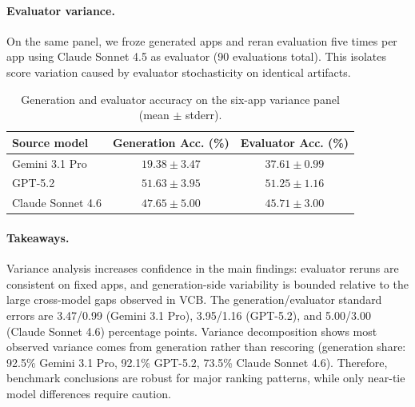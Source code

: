 \paragraph{Evaluator variance.}
On the same panel, we froze generated apps and reran evaluation five times per app using Claude Sonnet 4.5 as evaluator (90 evaluations total). This isolates score variation caused by evaluator stochasticity on identical artifacts.
\begin{table}[h]
\caption{Generation and evaluator accuracy on the six-app variance panel (mean $\pm$ stderr).}
\label{tab:generation_variance_summary}
\small
\begin{tabular}{@{}lcc@{}}
\toprule
\textbf{Source model} & \textbf{Generation Acc. (\%)} & \textbf{Evaluator Acc. (\%)} \\
\midrule
Gemini 3.1 Pro & $19.38 \pm 3.47$ & $37.61 \pm 0.99$ \\
GPT-5.2 & $51.63 \pm 3.95$ & $51.25 \pm 1.16$ \\
Claude Sonnet 4.6 & $47.65 \pm 5.00$ & $45.71 \pm 3.00$ \\
\bottomrule
\end{tabular}
\end{table}

\paragraph{Takeaways.}
Variance analysis increases confidence in the main findings: evaluator reruns are consistent on fixed apps, and generation-side variability is bounded relative to the large cross-model gaps observed in VCB. The generation/evaluator standard errors are 3.47/0.99 (Gemini 3.1 Pro), 3.95/1.16 (GPT-5.2), and 5.00/3.00 (Claude Sonnet 4.6) percentage points. Variance decomposition shows most observed variance comes from generation rather than rescoring (generation share: 92.5\% Gemini 3.1 Pro, 92.1\% GPT-5.2, 73.5\% Claude Sonnet 4.6). Therefore, benchmark conclusions are robust for major ranking patterns, while only near-tie model differences require caution.
